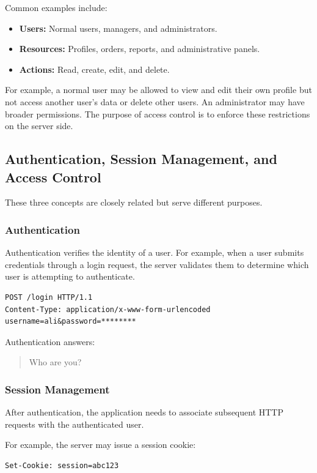 \documentclass[11pt,a4paper]{article}
\begin{document}
Common examples include:
\begin{itemize}
    \item \textbf{Users:} Normal users, managers, and administrators.
    \item \textbf{Resources:} Profiles, orders, reports, and administrative panels.
    \item \textbf{Actions:} Read, create, edit, and delete.
\end{itemize}

For example, a normal user may be allowed to view and edit their own profile but not access another user's data or delete other users. An administrator may have broader permissions.
The purpose of access control is to enforce these restrictions on the server side.

\subsection{Authentication, Session Management, and Access Control}

These three concepts are closely related but serve different purposes.

\subsubsection{Authentication}

Authentication verifies the identity of a user.
For example, when a user submits credentials through a login request, the server validates them to determine which user is attempting to authenticate.

\begin{lstlisting}[language=HTTP]
POST /login HTTP/1.1
Content-Type: application/x-www-form-urlencoded
username=ali&password=********
\end{lstlisting}

Authentication answers:
\begin{quote}
    Who are you?
\end{quote}

\subsubsection{Session Management}

After authentication, the application needs to associate subsequent HTTP requests with the authenticated user.

For example, the server may issue a session cookie:
\begin{lstlisting}[language=HTTP]
Set-Cookie: session=abc123
\end{lstlisting}
\end{document}
